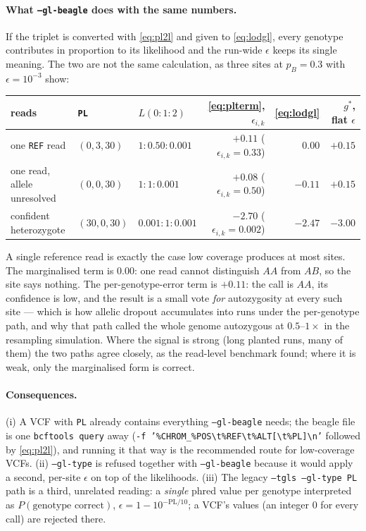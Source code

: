 \documentclass[11pt]{article}
\newcommand{\code}[1]{\texttt{#1}}
\begin{document}
\paragraph{What \code{--gl-beagle} does with the same numbers.} If the triplet is converted with \eqref{eq:pl2l} and given to \eqref{eq:lodgl}, every genotype contributes in proportion to its likelihood and the run-wide $\epsilon$ keeps its single meaning. The two are not the same calculation, as three sites at $p_B = 0.3$ with $\epsilon = 10^{-3}$ show:

\begin{center}
{\small
\begin{tabular}{@{}lllrrr@{}}
\toprule
reads & \code{PL} & $L(0{:}1{:}2)$ & \eqref{eq:plterm}, $\epsilon_{i,k}$ & \eqref{eq:lodgl} & $g^\ast$, flat $\epsilon$ \\
\midrule
one \code{REF} read & $(0, 3, 30)$ & $1 : 0.50 : 0.001$ & $+0.11$ \;($\epsilon_{i,k} = 0.33$) & $0.00$ & $+0.15$ \\
one read, allele unresolved & $(0, 0, 30)$ & $1 : 1 : 0.001$ & $+0.08$ \;($\epsilon_{i,k} = 0.50$) & $-0.11$ & $+0.15$ \\
confident heterozygote & $(30, 0, 30)$ & $0.001 : 1 : 0.001$ & $-2.70$ \;($\epsilon_{i,k} = 0.002$) & $-2.47$ & $-3.00$ \\
\bottomrule
\end{tabular}}
\end{center}

\noindent A single reference read is exactly the case low coverage produces at most sites. The marginalised term is $0.00$: one read cannot distinguish $AA$ from $AB$, so the site says nothing. The per-genotype-error term is $+0.11$: the call is $AA$, its confidence is low, and the result is a small vote \emph{for} autozygosity at every such site --- which is how allelic dropout accumulates into runs under the per-genotype path, and why that path called the whole genome autozygous at $0.5$--$1\times$ in the resampling simulation. Where the signal is strong (long planted runs, many of them) the two paths agree closely, as the read-level benchmark found; where it is weak, only the marginalised form is correct.

\paragraph{Consequences.} (i) A VCF with \code{PL} already contains everything \code{--gl-beagle} needs; the beagle file is one \code{bcftools query} away (\code{-f '\%CHROM\_\%POS\textbackslash t\%REF\textbackslash t\%ALT[\textbackslash t\%PL]\textbackslash n'} followed by \eqref{eq:pl2l}), and running it that way is the recommended route for low-coverage VCFs. (ii) \code{--gl-type} is refused together with \code{--gl-beagle} because it would apply a second, per-site $\epsilon$ on top of the likelihoods. (iii) The legacy \code{--tgls --gl-type PL} path is a third, unrelated reading: a \emph{single} phred value per genotype interpreted as $P(\text{genotype correct})$, $\epsilon = 1 - 10^{-\mathrm{PL}/10}$; a VCF's values (an integer $0$ for every call) are rejected there.
\end{document}

